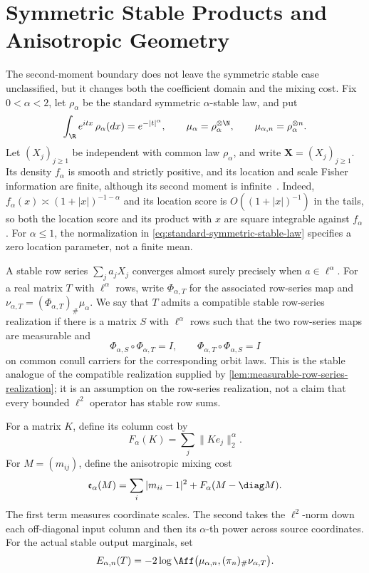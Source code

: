 \section{Symmetric Stable Products and Anisotropic Geometry}
\label{sec:symmetric-stable-products-and-anisotropic-geometry}

The second-moment boundary does not leave the symmetric stable case
unclassified, but it changes both the coefficient domain and the mixing
cost.
Fix \(0<\alpha<2\), let \(\rho_\alpha\) be the standard symmetric
\(\alpha\)-stable law, and put
\begin{equation}
 \int_\R e^{itx}\,\rho_\alpha(dx)=e^{-|t|^\alpha},
 \qquad
 \mu_\alpha=\rho_\alpha^{\otimes\N},
 \qquad
 \mu_{\alpha,n}=\rho_\alpha^{\otimes n}.
 \label{eq:standard-symmetric-stable-law}
\end{equation}
Let \((X_j)_{j\geq1}\) be independent with common law \(\rho_\alpha\), and
write \(\mathbf X=(X_j)_{j\geq1}\).
Its density \(f_\alpha\) is smooth and strictly positive, and its location
and scale Fisher information are finite, although its second moment is
infinite~\cite{bobkov2014stable}.
Indeed, \(f_\alpha(x)\asymp(1+|x|)^{-1-\alpha}\) and its location score is
\(O((1+|x|)^{-1})\) in the tails, so both the location score and its product
with \(x\) are square integrable against \(f_\alpha\).
For \(\alpha\le1\), the normalization in
\eqref{eq:standard-symmetric-stable-law} specifies a zero location parameter,
not a finite mean.

A stable row series \(\sum_ja_jX_j\) converges almost surely precisely when
\(a\in\ell^\alpha\).
For a real matrix \(T\) with \(\ell^\alpha\) rows, write
\(\Phi_{\alpha,T}\) for the associated row-series map and
\(\nu_{\alpha,T}=(\Phi_{\alpha,T})_\#\mu_\alpha\).
We say that \(T\) admits a compatible stable row-series realization if
there is a matrix \(S\)
with \(\ell^\alpha\) rows such that the two row-series maps are measurable
and
\[
 \Phi_{\alpha,S}\circ\Phi_{\alpha,T}=I,
 \qquad
 \Phi_{\alpha,T}\circ\Phi_{\alpha,S}=I
\]
on common conull carriers for the corresponding orbit laws.
This is the stable analogue of the compatible realization supplied by
\cref{lem:measurable-row-series-realization}; it is an assumption on the row-series realization, not a claim
that every bounded \(\ell^2\) operator has stable row sums.

For a matrix \(K\), define its column cost by
\[
 F_\alpha(K)=\sum_j\|Ke_j\|_2^\alpha.
\]
For \(M=(m_{ij})\), define the anisotropic mixing cost
\begin{equation}
 \mathfrak e_\alpha(M)
 =\sum_i|m_{ii}-1|^2
  +F_\alpha(M-\diag M).
 \label{eq:stable-mixing-cost}
\end{equation}
The first term measures coordinate scales.
The second takes the \(\ell^2\)-norm down each off-diagonal input
column and then its \(\alpha\)-th power across source coordinates.
For the actual stable output marginals, set
\begin{equation}
 E_{\alpha,n}(T)
 =-2\log\Aff\bigl(
       \mu_{\alpha,n},(\pi_n)_\#\nu_{\alpha,T}\bigr).
 \label{eq:stable-projected-hellinger-energy}
\end{equation}

